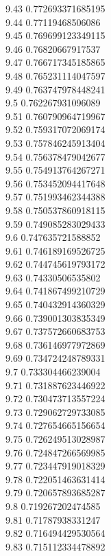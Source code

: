 {9.43	0.772693371685195\\
9.44	0.77119468506086\\
9.45	0.769699123349115\\
9.46	0.76820667917537\\
9.47	0.766717345185865\\
9.48	0.765231114047597\\
9.49	0.763747978448241\\
9.5	0.762267931096089\\
9.51	0.760790964719967\\
9.52	0.759317072069174\\
9.53	0.757846245913404\\
9.54	0.756378479042677\\
9.55	0.754913764267271\\
9.56	0.753452094417648\\
9.57	0.751993462344388\\
9.58	0.750537860918115\\
9.59	0.749085283029433\\
9.6	0.747635721588852\\
9.61	0.746189169526725\\
9.62	0.744745619793172\\
9.63	0.74330506535802\\
9.64	0.741867499210729\\
9.65	0.740432914360329\\
9.66	0.739001303835349\\
9.67	0.737572660683753\\
9.68	0.736146977972869\\
9.69	0.734724248789331\\
9.7	0.733304466239004\\
9.71	0.731887623446922\\
9.72	0.730473713557224\\
9.73	0.729062729733085\\
9.74	0.727654665156654\\
9.75	0.726249513028987\\
9.76	0.724847266569985\\
9.77	0.723447919018329\\
9.78	0.722051463631414\\
9.79	0.720657893685287\\
9.8	0.719267202474585\\
9.81	0.71787938331247\\
9.82	0.716494429530564\\
9.83	0.715112334478892\\
}
